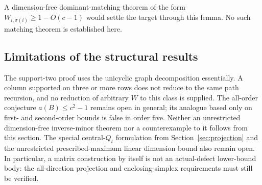 A dimension-free dominant-matching theorem of the form
$W_{i,\sigma(i)}\geq1-O(c-1)$ would settle the target through
this lemma.  No such matching theorem is established here.

\subsection{Limitations of the structural results}

The support-two proof uses the unicyclic graph decomposition
essentially.  A column supported on three or more rows does not
reduce to the same path recursion, and no reduction of arbitrary
$W$ to this class is supplied.  The all-order conjecture
$a(B)\leq c^2-1$ remains open in general; its analogue based only
on first- and second-order bounds is false in order five.
Neither an unrestricted dimension-free inverse-minor theorem nor
a counterexample to it follows from this section.  The special
central-$Q_t$ formulation from Section~\ref{sec:projection} and
the unrestricted prescribed-maximum linear dimension bound also
remain open.  In particular, a matrix construction by itself is
not an actual-defect lower-bound body: the all-direction projection
and enclosing-simplex requirements must still be verified.
